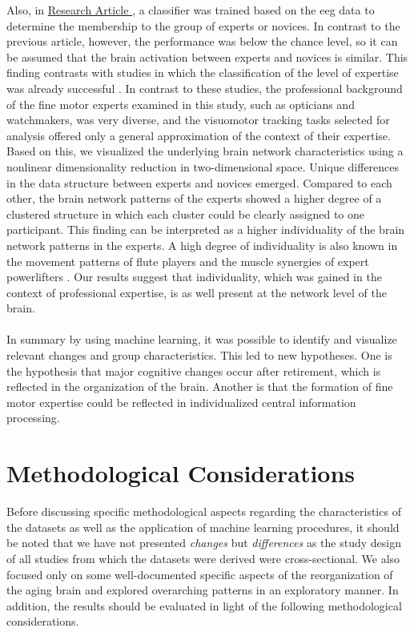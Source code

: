 Also, in \hyperref[results:paperIV]{Research Article }, a classifier was trained based on the \gls{eeg} data to determine the membership to the group of experts or novices. In contrast to the previous article, however, the performance was below the chance level, so it can be assumed that the brain activation between experts and novices is similar. This finding contrasts with studies in which the classification of the level of expertise was already successful \cite{Hosp2021, Winkler-Schwartz2019, Shourie2016}. In contrast to these studies, the professional background of the fine motor experts examined in this study, such as opticians and watchmakers, was very diverse, and the visuomotor tracking tasks selected for analysis offered only a general approximation of the context of their expertise. Based on this, we visualized the underlying brain network characteristics using a nonlinear dimensionality reduction in two-dimensional space. Unique differences in the data structure between experts and novices emerged. Compared to each other, the brain network patterns of the experts showed a higher degree of a clustered structure in which each cluster could be clearly assigned to one participant. This finding can be interpreted as a higher individuality of the brain network patterns in the experts. A high degree of individuality is also known in the movement patterns of flute players and the muscle synergies of expert powerlifters \cite{Albrecht2014, Caramiaux2018, Kristiansen2015}. Our results suggest that individuality, which was gained in the context of professional expertise, is as well present at the network level of the brain.\\
\\
In summary by using machine learning, it was possible to identify and visualize relevant changes and group characteristics. This led to new hypotheses. One is the hypothesis that major cognitive changes occur after retirement, which is reflected in the organization of the brain. Another is that the formation of fine motor expertise could be reflected in individualized central information processing.

\section{Methodological Considerations}
Before discussing specific methodological aspects regarding the characteristics of the datasets as well as the application of machine learning procedures, it should be noted that we have not presented \textit{changes} but \textit{differences} as the study design of all studies from which the datasets were derived were cross-sectional. We also focused only on some well-documented specific aspects of the reorganization of the aging brain and explored overarching patterns in an exploratory manner. In addition, the results should be evaluated in light of the following methodological considerations. 

